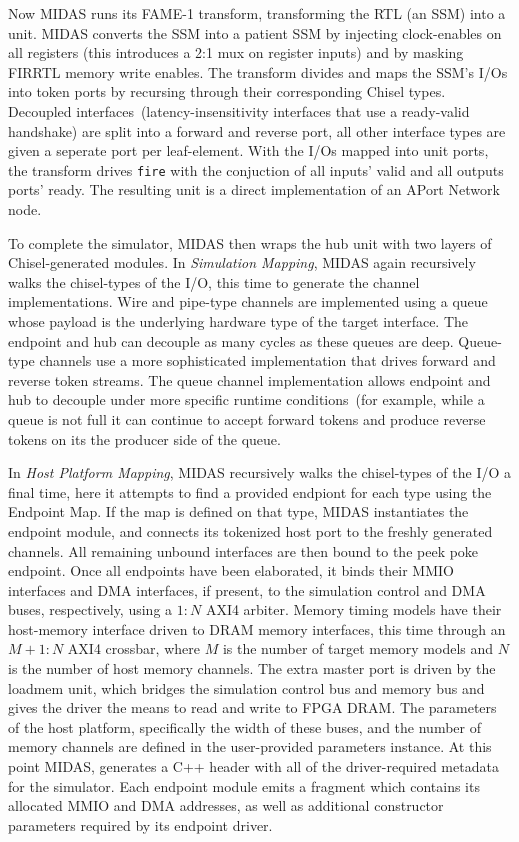 Now MIDAS runs its FAME-1 transform, transforming the RTL (an SSM) into a
unit.  MIDAS converts the SSM into a patient SSM by injecting clock-enables
on all registers (this introduces a 2:1 mux on register inputs) and by
masking FIRRTL memory write enables. The transform divides and maps the
SSM's I/Os into token ports by recursing through their corresponding Chisel types.
Decoupled interfaces~(latency-insensitivity interfaces that use a ready-valid
handshake) are split into a forward and reverse port, all other
interface types are given a seperate port per leaf-element.  With the I/Os
mapped into unit ports, the transform drives \texttt{fire} with the
conjuction of all inputs' valid and all outputs ports' ready. The resulting
unit is a direct implementation of an APort Network node.

To complete the simulator, MIDAS then wraps the hub unit with two layers of Chisel-generated modules.
In \emph{Simulation Mapping}, MIDAS again recursively walks the chisel-types of the I/O, this time
to generate the channel implementations.
Wire and pipe-type channels are implemented using a queue whose
payload is the underlying hardware type of the target interface. The endpoint and hub can decouple
as many cycles as these queues are deep.  Queue-type channels use a more sophisticated implementation
that drives forward and reverse token streams. The queue channel
implementation allows endpoint and hub to decouple under more specific runtime conditions~(for example,
while a queue is not full it can continue to accept forward tokens and produce reverse tokens on its the producer side
of the queue.

In \emph{Host Platform Mapping}, MIDAS recursively walks the chisel-types
of the I/O a final time, here it attempts to find a provided endpiont for
each type using the Endpoint Map. If the map is defined on that type, MIDAS
instantiates the endpoint module, and connects its tokenized host port to the freshly
generated channels. All remaining unbound interfaces are then bound to the
peek poke endpoint. Once all endpoints have been elaborated, it binds their
MMIO interfaces and DMA interfaces, if present, to the simulation control
and DMA buses, respectively, using a $1:N$ AXI4 arbiter. Memory timing
models have their host-memory interface driven to DRAM memory interfaces,
this time through an $M+1:N$ AXI4 crossbar, where $M$ is the number of
target memory models and $N$ is the number of host memory channels. The
extra master port is driven by the loadmem unit, which bridges the
simulation control bus and memory bus and gives the driver the means to
read and write to FPGA DRAM. The parameters of the host platform,
specifically the width of these buses, and the number of memory channels
are defined in the user-provided parameters instance. At this point MIDAS,
generates a C++ header with all of the driver-required metadata for the
simulator. Each endpoint module emits a fragment which contains its allocated MMIO and
DMA addresses, as well as additional constructor parameters required by its
endpoint driver.

